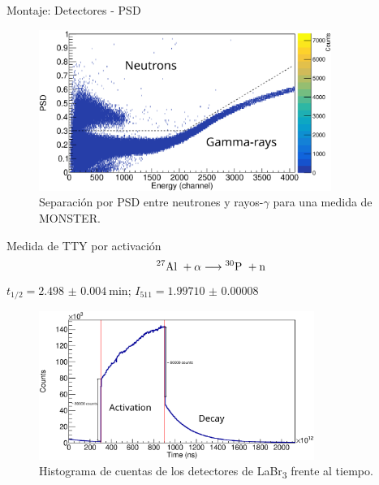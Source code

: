 \documentclass[11pt]{beamer}
\newcommand{\Aliso}{\textsuperscript{27}Al }
\newcommand{\Piso}{\textsuperscript{30}P }
\begin{document}
\begin{frame}{Montaje: Detectores - PSD}
	\begin{figure}[H]
		\centering
		\includegraphics[width=0.85\textwidth]{example_psd.eps}
		\caption{Separación por PSD entre neutrones y rayos-$\gamma$ para una medida de MONSTER.}
		\label{}
	\end{figure}
\end{frame}






\begin{frame}{Medida de TTY por activación}
	\[ \text{\Aliso} + \alpha \longrightarrow \text{\Piso} + \text{n}   \]
	\centering
	$t_{1/2} = \qty{2.498(4)}{\minute}$; 
	$I_{511} = \num{1.99710(8)}$
	\begin{figure}[H]
		\centering
		\includegraphics[width=0.80\textwidth]{example_activation_time_histogram.eps}
		\caption{Histograma de cuentas de los detectores de LaBr\textsubscript{3} frente al tiempo.}
		\label{example_activation_time_histogram}
	\end{figure}
\end{frame}
\end{document}
